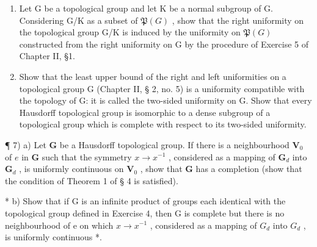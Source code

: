 \begin{enumerate}
\def\labelenumi{\arabic{enumi})}
\setcounter{enumi}{4}
\item
  Let G be a topological group and let K be a normal subgroup of G. Considering G/K as a subset of \(\mathfrak{P}(G)\) , show that the right uniformity on the topological group G/K is induced by the uniformity on \(\mathfrak{P}(G)\) constructed from the right uniformity on G by the procedure of Exercise 5 of Chapter II, §1.
\item
  Show that the least upper bound of the right and left uniformities on a topological group G (Chapter II, § 2, no. 5) is a uniformity compatible with the topology of G: it is called the two-sided uniformity on G. Show that every Hausdorff topological group is isomorphic to a dense subgroup of a topological group which is complete with respect to its two-sided uniformity.
\end{enumerate}

¶ 7) a) Let \(\mathbf{G}\) be a Hausdorff topological group. If there is a neighbourhood \(\mathbf{V}_0\) of \(e\) in \(\mathbf{G}\) such that the symmetry \(x \to x^{-1}\) , considered as a mapping of \(\mathbf{G}_d\) into \(\mathbf{G}_d\) , is uniformly continuous on \(\mathbf{V}_0\) , show that \(\mathbf{G}\) has a completion (show that the condition of Theorem 1 of § 4 is satisfied).

* b) Show that if G is an infinite product of groups each identical with the topological group defined in Exercise 4, then G is complete but there is no neighbourhood of e on which \(x \rightarrow x^{-1}\) , considered as a mapping of \(G_{d}\) into \(G_{d}\) , is uniformly continuous *.

